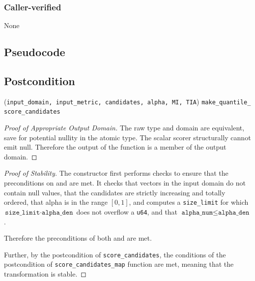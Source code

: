 \documentclass{article}
\begin{document}
\subsubsection*{Caller-verified}
None

\subsection*{Pseudocode}
\label{sec:python-pseudocode}



\subsection*{Postcondition}
\begin{theorem}
\validTransformation
    {(\texttt{input\_domain, input\_metric, candidates, alpha, MI, TIA})}
    {\texttt{make\_quantile\_\\score\_candidates}}
\end{theorem}


\begin{proof}[Proof of Appropriate Output Domain]
    \label{sec:approp-output-domain}
    The raw type and domain are equivalent, save for potential nullity in the atomic type.
    The scalar scorer structurally cannot emit null.
    Therefore the output of the function is a member of the output domain.
\end{proof}

\begin{proof}[Proof of Stability]
    \label{sec:stability}
    The constructor first performs checks to ensure that the preconditions on  and  are met.
    It checks that vectors in the input domain do not contain null values,
    that the candidates are strictly increasing and totally ordered,
    that alpha is in the range $[0, 1]$,
    and computes a \texttt{size\_limit} for which $\texttt{size\_limit} \cdot \texttt{alpha\_den}$ does not overflow a \texttt{u64},
    and that $\texttt{alpha\_num} \le \texttt{alpha\_den}$.

    Therefore the preconditions of both  and  are met.

    Further, by the postcondition of \texttt{score\_candidates},
    the conditions of the postcondition of \texttt{score\_candidates\_map} function are met,
    meaning that the transformation is stable.
\end{proof}



\end{document}

